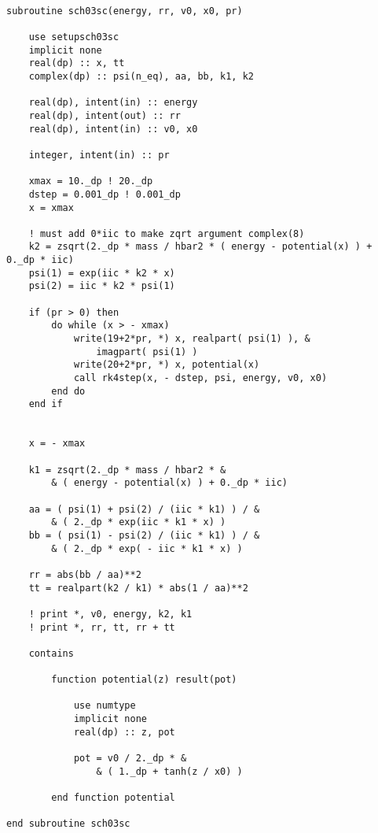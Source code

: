 \documentclass[12pt]{article}
\begin{document}
\begin{lstlisting}[frame=single,caption={{\tt sch03sc.f90}},label=sch03sc]

subroutine sch03sc(energy, rr, v0, x0, pr)

    use setupsch03sc
    implicit none
    real(dp) :: x, tt
    complex(dp) :: psi(n_eq), aa, bb, k1, k2

    real(dp), intent(in) :: energy
    real(dp), intent(out) :: rr 
    real(dp), intent(in) :: v0, x0

    integer, intent(in) :: pr

    xmax = 10._dp ! 20._dp
    dstep = 0.001_dp ! 0.001_dp
    x = xmax
   
    ! must add 0*iic to make zqrt argument complex(8)
    k2 = zsqrt(2._dp * mass / hbar2 * ( energy - potential(x) ) + 0._dp * iic)
    psi(1) = exp(iic * k2 * x)
    psi(2) = iic * k2 * psi(1)

    if (pr > 0) then
        do while (x > - xmax) 
            write(19+2*pr, *) x, realpart( psi(1) ), &
                imagpart( psi(1) )
            write(20+2*pr, *) x, potential(x)
            call rk4step(x, - dstep, psi, energy, v0, x0)
        end do
    end if
  

    x = - xmax 

    k1 = zsqrt(2._dp * mass / hbar2 * &
        & ( energy - potential(x) ) + 0._dp * iic)

    aa = ( psi(1) + psi(2) / (iic * k1) ) / &
        & ( 2._dp * exp(iic * k1 * x) )
    bb = ( psi(1) - psi(2) / (iic * k1) ) / &
        & ( 2._dp * exp( - iic * k1 * x) )
    
    rr = abs(bb / aa)**2
    tt = realpart(k2 / k1) * abs(1 / aa)**2

    ! print *, v0, energy, k2, k1
    ! print *, rr, tt, rr + tt 

    contains 

        function potential(z) result(pot)

            use numtype
            implicit none
            real(dp) :: z, pot
        
            pot = v0 / 2._dp * &
                & ( 1._dp + tanh(z / x0) )
        
        end function potential

end subroutine sch03sc

\end{lstlisting}
\end{document}
